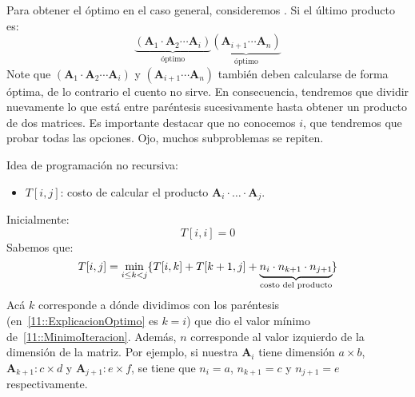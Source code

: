   Para obtener el óptimo en el caso general,
  consideremos .
  Si el último producto es:
  \begin{equation}
    \label{11::ExplicacionOptimo}
    \underbrace{
      (\mathbf{A}_1 \cdot \mathbf{A}_2 \dotsm \mathbf{A}_i)
    }_{\text{óptimo}}
       \underbrace{(\mathbf{A}_{i + 1} \dotsm \mathbf{A}_n)}_{\text{óptimo}}
  \end{equation}
  Note que \((\mathbf{A}_1 \cdot \mathbf{A}_2 \dotsm \mathbf{A}_i)\)
  y \((\mathbf{A}_{i + 1} \dotsm \mathbf{A}_n)\)
  también deben calcularse de forma óptima,
  de lo contrario el cuento no sirve.
  En consecuencia,
  tendremos que dividir nuevamente lo que está entre paréntesis
  sucesivamente hasta obtener un producto de dos matrices.
  Es importante destacar que no conocemos \(i\),
  que tendremos que probar todas las opciones.
  Ojo,
  muchos subproblemas se repiten.

  Idea de programación no recursiva:
  \begin{itemize}
  \item \(T[i, j]\):
    costo de calcular el producto
      \(\mathbf{A}_i\cdot \ldots \cdot \mathbf{A}_j\).
  \end{itemize}
  Inicialmente:
  \begin{equation*}
    T[i, i] = 0
  \end{equation*}
  Sabemos que:
  \begin{equation}
    \label{11::MinimoIteracion}
    T[i, j]
      = \min_{i \le k < j}
	  \{ T[i, k] + T[k+1, j]
	      + \underbrace{
		  n_i \cdot n_{k + 1} \cdot n_{j + 1}
		}_{\text{costo del producto}}\hspace{-0.2mm}
	  \}
  \end{equation}
  Acá \(k\) corresponde a dónde dividimos con los paréntesis
  (en~\eqref{11::ExplicacionOptimo}
   es \(k = i\))
  que dio el valor mínimo de~\eqref{11::MinimoIteracion}.
  Además,
  \(n\) corresponde al valor izquierdo de la dimensión de la matriz.
  Por ejemplo,
  si nuestra \(\mathbf{A}_i\) tiene dimensión \(a \times b\),
  \(\mathbf{A}_{k + 1}: c \times d\) y \(\mathbf{A}_{j + 1}: e \times f\),
  se tiene que \(n_i = a\),
  \(n_{k + 1} = c\) y \(n_{j+1} = e\) respectivamente.


